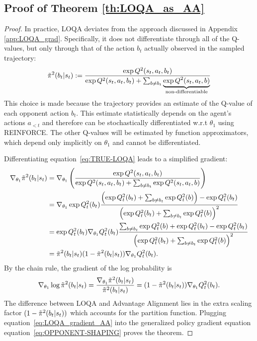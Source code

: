 \documentclass{article} \usepackage{iclr2025_conference,times}
\def\eqref#1{equation~\ref{#1}}
\begin{document}
\subsection{Proof of Theorem \ref{th:LOQA_as_AA}}
\label{app:LOQA}
\begin{proof}
In practice, LOQA deviates from the approach discussed in Appendix \ref{app:LOQA_grad}. Specifically, it does not differentiate through all of the Q-values, but only through that of the action $b_t$ actually observed in the sampled trajectory:
\begin{equation}
    \label{eq:TRUE-LOQA}
    \Tilde{\pi}^2(b_t|s_t) := \frac{\exp Q^2(s_t, a_t, b_t)}{\exp Q^2(s_t, a_t, b_t) + \sum_{b \neq b_t}\underbrace{\exp Q^2(s_t, a_t, b)}_{\text{non-differentiable}}}
\end{equation}
This choice is made because the trajectory provides an estimate of the Q-value of each opponent action $b_t$.
This estimate statistically depends on the agent's actions $a_{<t}$ and therefore can be stochastically differentiated w.r.t $\theta_1$ using REINFORCE.
The other Q-values will be estimated by function approximators, which depend only implicitly on $\theta_1$ and cannot be differentiated.

Differentiating \eqref{eq:TRUE-LOQA} leads to a simplified gradient:
\begin{align}
    \nabla_{\theta_1}\Tilde{\pi}^2(b_t|s_t) &= \nabla_{\theta_1}\left(   \frac{\exp Q^2(s_t, a_t, b_t)}{\exp Q^2(s_t, a_t, b_t) + \sum_{b \neq b_t}\exp Q^2(s_t, a_t, b)}\right)\\
    &= \nabla_{\theta_1} \exp Q^2_t(b_t)\frac{\left(\exp Q^2_t(b_t) + \sum_{b \neq b_t}\exp Q^2_t(b)\right) - \exp Q^2_t(b_t)}{\left(\exp Q^2_t(b_t) + \sum_{b \neq b_t}\exp Q^2_t(b)\right)^2} \\
    &= \exp Q^2_t(b_t) \nabla_{\theta_1} Q^2_t(b_t) \frac{\sum_{b \neq b_t}\exp Q^2_t(b) + \exp Q^2_t(b_t)- \exp Q^2_t(b_t)}{\left(\exp Q^2_t(b_t) + \sum_{b \neq b_t}\exp Q^2_t(b)\right)^2}\\
    &= \Tilde{\pi}^2(b_t|s_t) (1 - \Tilde{\pi}^2(b_t|s_t)) \nabla_{\theta_1} Q^2_t(b_t).
\end{align}
By the chain rule, the gradient of the log probability is
\begin{equation}\label{eq:LOQA_gradient_AA}
    \nabla_{\theta_1}\log \Tilde{\pi}^2(b_t|s_t)
    = \frac{\nabla_{\theta_1} \Tilde\pi^2(b_t|s_t)}{\Tilde\pi^2(b_t|s_t)} 
    = (1 - \Tilde{\pi}^2(b_t|s_t))\nabla_{\theta_1}Q^2_t(b_t).
\end{equation}
The difference between LOQA and Advantage Alignment lies in the extra scaling factor $(1 - \Tilde{\pi}^2(b_t|s_t))$ which accounts for the partition function. Plugging \eqref{eq:LOQA_gradient_AA} into the generalized policy gradient equation \eqref{eq:OPPONENT-SHAPING} proves the theorem.
\end{proof}
\end{document}
